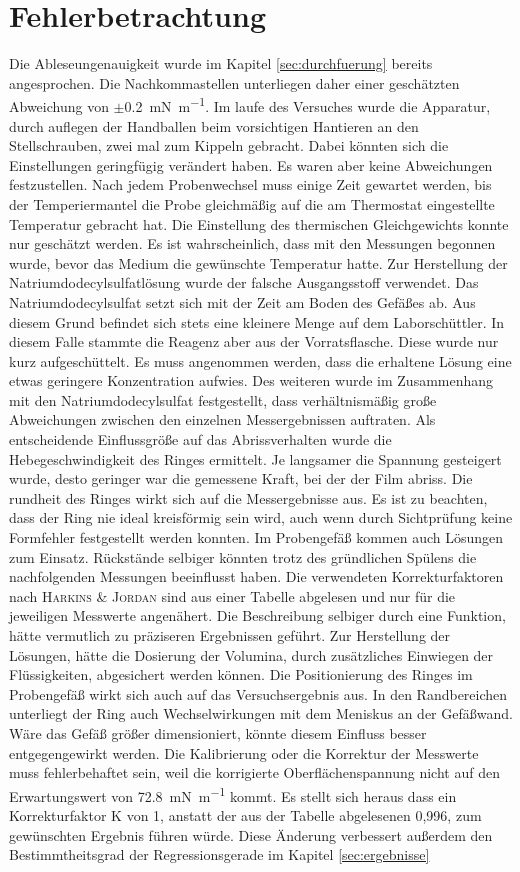 \newpage
\section{Fehlerbetrachtung}
\label{sec:fehler}
Die Ableseungenauigkeit wurde im Kapitel \ref{sec:durchfuerung} bereits angesprochen. Die Nachkommastellen unterliegen daher einer geschätzten Abweichung von $\pm$\SI{0,2}{\milli\newton\per\meter}. Im laufe des Versuches wurde die Apparatur, durch auflegen der Handballen beim vorsichtigen Hantieren an den Stellschrauben, zwei  mal zum Kippeln gebracht. Dabei könnten sich die Einstellungen geringfügig verändert haben. Es waren aber keine Abweichungen festzustellen. Nach jedem Probenwechsel muss einige Zeit gewartet werden, bis der Temperiermantel die Probe gleichmäßig auf die am Thermostat eingestellte Temperatur gebracht hat. Die Einstellung des thermischen Gleichgewichts konnte nur geschätzt werden. Es ist wahrscheinlich, dass mit den Messungen begonnen wurde, bevor das Medium die gewünschte Temperatur hatte. Zur Herstellung der Natriumdodecylsulfatlösung wurde der falsche Ausgangsstoff verwendet. Das Natriumdodecylsulfat setzt sich mit der Zeit am Boden des Gefäßes ab. Aus diesem Grund befindet sich stets eine kleinere Menge auf dem Laborschüttler. In diesem Falle stammte die Reagenz aber aus der Vorratsflasche. Diese wurde nur kurz aufgeschüttelt. Es muss angenommen werden, dass die erhaltene Lösung eine etwas geringere Konzentration aufwies. Des weiteren wurde im Zusammenhang mit den Natriumdodecylsulfat festgestellt, dass verhältnismäßig große Abweichungen zwischen den einzelnen Messergebnissen auftraten. Als entscheidende Einflussgröße auf das Abrissverhalten wurde die Hebegeschwindigkeit des Ringes ermittelt. Je langsamer die Spannung gesteigert wurde, desto geringer war die gemessene Kraft, bei der der Film abriss. Die rundheit des Ringes wirkt sich auf die Messergebnisse aus. Es ist zu beachten, dass der Ring nie ideal kreisförmig sein wird, auch wenn durch Sichtprüfung keine Formfehler festgestellt werden konnten. Im Probengefäß kommen auch Lösungen zum Einsatz. Rückstände selbiger könnten trotz des gründlichen Spülens die nachfolgenden Messungen beeinflusst haben. Die verwendeten Korrekturfaktoren nach \textsc{Harkins \& Jordan} sind aus einer Tabelle abgelesen und nur für die jeweiligen Messwerte angenähert. Die Beschreibung selbiger durch eine Funktion, hätte vermutlich zu präziseren Ergebnissen geführt. Zur Herstellung der Lösungen, hätte die Dosierung der Volumina, durch zusätzliches Einwiegen der Flüssigkeiten, abgesichert werden können. Die Positionierung des Ringes im Probengefäß wirkt sich auch auf das Versuchsergebnis aus. In den Randbereichen unterliegt der Ring auch Wechselwirkungen mit dem Meniskus an der Gefäßwand. Wäre das Gefäß größer dimensioniert, könnte diesem Einfluss besser entgegengewirkt werden.
Die Kalibrierung oder die Korrektur der Messwerte muss fehlerbehaftet sein, weil die korrigierte Oberflächenspannung nicht auf den Erwartungswert von \SI{72,8}{\milli\newton\per\meter} kommt. Es stellt sich heraus dass ein Korrekturfaktor K von 1, anstatt der aus der Tabelle abgelesenen 0,996, zum gewünschten Ergebnis führen würde. Diese Änderung verbessert außerdem den Bestimmtheitsgrad der Regressionsgerade im Kapitel \ref{sec:ergebnisse} 
